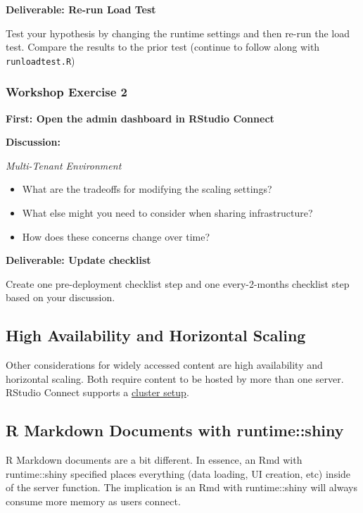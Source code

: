 \documentclass[]{book}
\providecommand{\tightlist}{%
  \setlength{\itemsep}{0pt}\setlength{\parskip}{0pt}}
\theoremstyle{definition}
\theoremstyle{definition}
\theoremstyle{definition}
\theoremstyle{remark}
\begin{document}
\textbf{Deliverable: Re-run Load Test}

Test your hypothesis by changing the runtime settings and then re-run
the load test. Compare the results to the prior test (continue to follow
along with \texttt{runloadtest.R})

\hypertarget{workshop-exercise-2}{%
\subsubsection{Workshop Exercise 2}\label{workshop-exercise-2}}

\textbf{First: Open the admin dashboard in RStudio Connect}

\textbf{Discussion:}

\emph{Multi-Tenant Environment}

\begin{itemize}
\tightlist
\item
  What are the tradeoffs for modifying the scaling settings?
\item
  What else might you need to consider when sharing infrastructure?
\item
  How does these concerns change over time?
\end{itemize}

\textbf{Deliverable: Update checklist}

Create one pre-deployment checklist step and one every-2-months
checklist step based on your discussion.

\hypertarget{high-availability-and-horizontal-scaling}{%
\subsection{High Availability and Horizontal
Scaling}\label{high-availability-and-horizontal-scaling}}

Other considerations for widely accessed content are high availability
and horizontal scaling. Both require content to be hosted by more than
one server. RStudio Connect supports a
\href{https://docs.rstudio.com/connect/admin/high-availability.html}{cluster
setup}.

\hypertarget{r-markdown-documents-with-runtimeshiny}{%
\subsection{R Markdown Documents with
runtime::shiny}\label{r-markdown-documents-with-runtimeshiny}}

R Markdown documents are a bit different. In essence, an Rmd with
runtime::shiny specified places everything (data loading, UI creation,
etc) inside of the server function. The implication is an Rmd with
runtime::shiny will always consume more memory as users connect.
\end{document}
